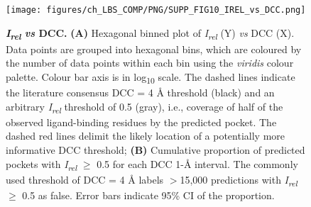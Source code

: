 \begin{figure}[htb!]
    \centering
    \texttt{[image: figures/ch\_LBS\_COMP/PNG/SUPP\_FIG10\_IREL\_vs\_DCC.png]}
    \caption[\textit{I\textsubscript{rel}} \textit{vs} DCC]{\textbf{\textit{I\textsubscript{rel}} \textit{vs} DCC.} \textbf{(A)} Hexagonal binned plot of \textit{I\textsubscript{rel}} (Y) \textit{vs} DCC (X). Data points are grouped into hexagonal bins, which are coloured by the number of data points within each bin using the \textit{viridis} colour palette. Colour bar axis is in log\textsubscript{10} scale. The dashed lines indicate the literature consensus DCC = 4 \AA{} threshold (black) and an arbitrary \textit{I\textsubscript{rel}} threshold of 0.5 (gray), i.e., coverage of half of the observed ligand-binding residues by the predicted pocket. The dashed red lines delimit the likely location of a potentially more informative DCC threshold; \textbf{(B)} Cumulative proportion of predicted pockets with \textit{I\textsubscript{rel}} $\geq$ 0.5 for each DCC 1-\AA{} interval. The commonly used threshold of DCC = 4 \AA{} labels $>$15,000 predictions with \textit{I\textsubscript{rel}} $\geq$ 0.5 as false. Error bars indicate 95\% CI of the proportion.}
    \label{fig:irel_vs_dcc}
\end{figure}

